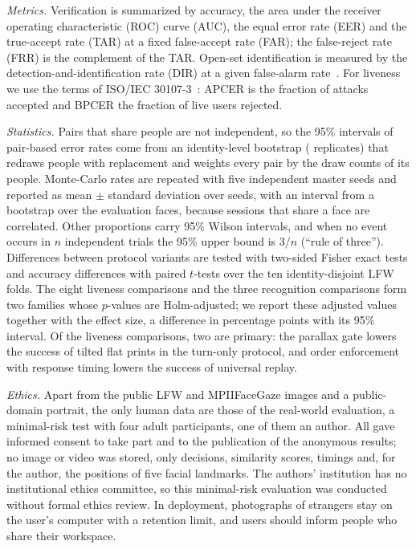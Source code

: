 \documentclass[journal]{IEEEtran}
\begin{document}
\emph{Metrics.} Verification is summarized by accuracy, the area under the receiver operating characteristic (ROC) curve (AUC), the equal error rate (EER) and the true-accept rate (TAR) at a fixed false-accept rate (FAR); the false-reject rate (FRR) is the complement of the TAR. Open-set identification is measured by the detection-and-identification rate (DIR) at a given false-alarm rate~\cite{gunther2017openset}. For liveness we use the terms of ISO/IEC 30107-3~\cite{iso30107-3}: APCER is the fraction of attacks accepted and BPCER the fraction of live users rejected.

\emph{Statistics.} Pairs that share people are not independent, so the 95\% intervals of pair-based error rates come from an identity-level bootstrap (\bsB{} replicates) that redraws people with replacement and weights every pair by the draw counts of its people. Monte-Carlo rates are repeated with five independent master seeds and reported as mean $\pm$ standard deviation over seeds, with an interval from a bootstrap over the \msFaces{} evaluation faces, because sessions that share a face are correlated. Other proportions carry 95\% Wilson intervals, and when no event occurs in $n$ independent trials the 95\% upper bound is $3/n$ (``rule of three''). Differences between protocol variants are tested with two-sided Fisher exact tests and accuracy differences with paired $t$-tests over the ten identity-disjoint LFW folds. The eight liveness comparisons and the three recognition comparisons form two families whose $p$-values are Holm-adjusted; we report these adjusted values together with the effect size, a difference in percentage points with its 95\% interval. Of the liveness comparisons, two are primary: the parallax gate lowers the success of tilted flat prints in the turn-only protocol, and order enforcement with response timing lowers the success of universal replay.

\emph{Ethics.} Apart from the public LFW and MPIIFaceGaze images and a public-domain portrait, the only human data are those of the real-world evaluation, a minimal-risk test with four adult participants, one of them an author. All gave informed consent to take part and to the publication of the anonymous results; no image or video was stored, only decisions, similarity scores, timings and, for the author, the positions of five facial landmarks. The authors' institution has no institutional ethics committee, so this minimal-risk evaluation was conducted without formal ethics review. In deployment, photographs of strangers stay on the user's computer with a retention limit, and users should inform people who share their workspace.
\end{document}
